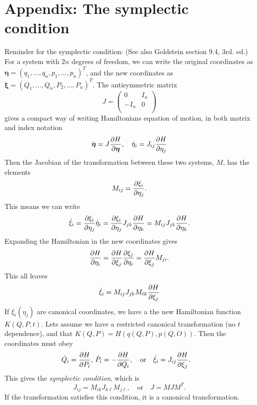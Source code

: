 \documentclass{article}
\begin{document}
    \section*{Appendix: The symplectic condition}
        Reminder for the symplectic condition: (See also Goldstein section 9.4, 3rd. ed.) For a system with $2n$ degrees of freedom, we can write the original coordinates as $\boldsymbol{\eta} = (q_1, ..., q_n, p_1, ..., p_n)^T$, and the new coordinates as $\boldsymbol{\xi} = (Q_1, ..., Q_n, P_2, ..., P_n)^T$. 
        The antisymmetric matrix
        \begin{equation*}
            J = \begin{pmatrix*}
                0 & I_n \\
                -I_n & 0 \\
            \end{pmatrix*}
        \end{equation*}
        gives a compact way of writing Hamiltonians equation of motion, in both matrix and index notation
        \begin{equation*}
            \dot{\boldsymbol{\eta}} = J \pdv{H}{\boldsymbol{\eta}}, \quad
            \dot \eta_i = J_{ij} \pdv{H}{\eta_j}
        \end{equation*}
        Then the Jacobian of the transformation between these two systems, $M$, has the elements
        \begin{equation*}
            M_{ij} = \pdv{\xi_i}{\eta_j}.
        \end{equation*}
        This means we can write 
        \begin{equation*}
            \dot \xi_i = \pdv{\xi_i}{\eta_j} \dot \eta_i = \pdv{\xi_i}{\eta_j} J_{jk} \pdv{H}{\eta_k} = M_{ij} J_{jk} \pdv{H}{\eta_k}.
        \end{equation*}
        Expanding the Hamiltonian in the new coordinates gives
        \begin{equation*}
            \pdv{H}{\eta_i} = \pdv{H}{\xi_j} \pdv{\xi_j}{\eta_i} = \pdv{H}{\xi_j} M_{ji}.
        \end{equation*}
        This all leaves
        \begin{equation*}
            \dot \xi_i = M_{ij} J_{jk} M_{\ell k} \pdv{H}{\xi_j}
        \end{equation*}
        If $\xi_i(\eta_j)$ are canonical coordinates, we have a the new Hamiltonian function $K(Q, P, t)$. Lets assume we have a restricted canonical transformation (no $t$ dependence), and that $K(Q, P) = H(q(Q, P), p(Q, O))$. Then the coordinates must obey
        \begin{align*}
            &\dot Q_i = \pdv{H}{P_i}, \, \dot P_i = -\pdv{H}{Q_i}, \quad \mathrm{or} \quad \dot \xi_i = J_{ij} \pdv{H}{\xi_j}.
        \end{align*}
        This gives the \emph{symplectic condition}, which is 
        \begin{equation*}
            J_{ij} =  M_{ik} J_{k\ell} M_{j \ell}, \quad \mathrm{or} \quad J = M J M^T.
        \end{equation*}
        If the transformation satisfies this condition, it is a canonical transformation.
\end{document}
